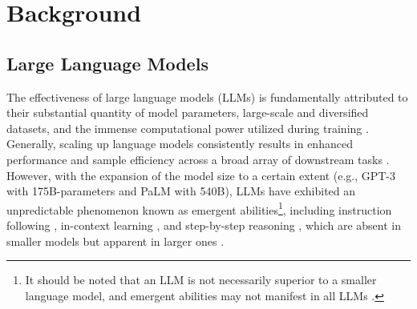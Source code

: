 \section{Background}\label{sec:background}
\subsection{Large Language Models}\label{sec:llms}
The effectiveness of large language models (LLMs) is fundamentally attributed to their substantial quantity of model parameters, large-scale and diversified datasets, and the immense computational power utilized during training \cite{kaplan2020scaling,hoffmann2022training}. 
Generally, scaling up language models consistently results in enhanced performance and sample efficiency across a broad array of downstream tasks \cite{wei2022emergent,zhao2023survey}. 
However, with the expansion of the model size to a certain extent (e.g., GPT-3 \cite{brown2020language} with 175B-parameters and PaLM \cite{chowdhery2023palm} with 540B), LLMs have exhibited an unpredictable phenomenon known as emergent abilities\footnote{It should be noted that an LLM is not necessarily superior to a smaller language model, and emergent abilities may not manifest in all LLMs \cite{zhao2023survey}.}, including instruction following \cite{ouyang2022training}, in-context learning \cite{dong2022survey}, and step-by-step reasoning \cite{wei2022chain,huang2022towards}, which are absent in smaller models but apparent in larger ones \cite{wei2022emergent}.


